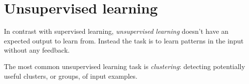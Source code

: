 
\section{Unsupervised learning}\label{sec:theory:unsuplearn}

In contrast with supervised learning, \textit{unsupervised learning} doesn't have an expected output to learn from. Instead the task is to learn patterns in the input without any feedback.

The most common unsupervised learning task is \textit{clustering}: detecting potentially useful clusters, or groups, of input examples. \citep{norvigAI}

